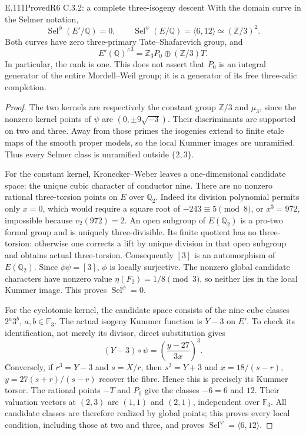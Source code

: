 \begin{result}{E.111}{Proved}{R6 C.3.2: a complete three-isogeny descent}
With the domain curve in the Selmer notation,
\[
 \operatorname{Sel}^{\phi}(E'/\mathbb Q)=0,\qquad
 \operatorname{Sel}^{\psi}(E/\mathbb Q)
      =\langle6,12\rangle\simeq(\mathbb Z/3)^2.
\]
Both curves have zero three-primary Tate--Shafarevich group, and
\[
 E'(\mathbb Q)^{\wedge3}
     =\mathbb Z_3P_0\oplus(\mathbb Z/3)T.
\]
In particular, the rank is one. This does not assert that $P_0$ is
an integral generator of the entire Mordell--Weil group; it is a
generator of its free three-adic completion.
\end{result}
\begin{proof}
The two kernels are respectively the constant group $\mathbb Z/3$
and $\mu_3$, since the nonzero kernel points of $\psi$ are
$(0,\pm9\sqrt{-3})$. Their discriminants are supported on two and
three. Away from those primes the isogenies extend to finite etale
maps of the smooth proper models, so the local Kummer images are
unramified. Thus every Selmer class is unramified outside $\{2,3\}$.

For the constant kernel, Kronecker--Weber
\citep[I.4.16, pp.~49--50]{RootMilneCFT} leaves a one-dimensional
candidate space: the unique cubic character of conductor nine.
There are no nonzero rational three-torsion points on $E$ over
$\mathbb Q_2$. Indeed its division polynomial permits only $x=0$,
which would require a square root of $-243\equiv5\pmod8$, or
$x^3=972$, impossible because $v_2(972)=2$. An open subgroup of
$E(\mathbb Q_2)$ is a pro-two formal group and is uniquely
three-divisible. Its finite quotient has no three-torsion: otherwise
one corrects a lift by unique division in that open subgroup and
obtains actual three-torsion. Consequently $[3]$ is an automorphism
of $E(\mathbb Q_2)$. Since $\phi\psi=[3]$, $\phi$ is locally
surjective. The nonzero global candidate characters have nonzero
value $\eta(F_2)=1/8\pmod3$, so neither lies in the local Kummer
image. This proves $\operatorname{Sel}^{\phi}=0$.

For the cyclotomic kernel, the candidate space consists of the nine
cube classes $2^a3^b$, $a,b\in\mathbb F_3$. The actual isogeny
Kummer function is $Y-3$ on $E'$. To check its identification, not
merely its divisor, direct substitution gives
\[
 (Y-3)\circ\psi=\left(\frac{y-27}{3x}\right)^3.
\]
Conversely, if $r^3=Y-3$ and $s=X/r$, then $s^3=Y+3$ and
$x=18/(s-r)$, $y=27(s+r)/(s-r)$ recover the fibre. Hence this is
precisely its Kummer torsor. The rational points $-T$ and $P_0$
give the classes $-6=6$ and $12$. Their valuation vectors at
$(2,3)$ are $(1,1)$ and $(2,1)$, independent over $\mathbb F_3$.
All candidate classes are therefore realized by global points;
this proves every local condition, including those at two and three,
and proves $\operatorname{Sel}^{\psi}=\langle6,12\rangle$.


\end{proof}
